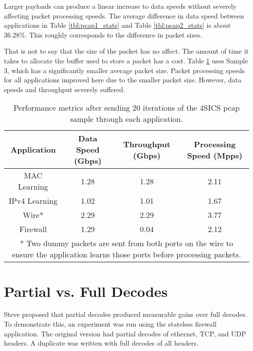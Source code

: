 Larger payloads can produce a linear increase to data speeds without severely affecting packet processing speeds. The average difference in data speed between applications in Table \ref{tbl:pcap1_stats} and Table \ref{tbl:pcap2_stats} is about 36.28\%. This roughly corresponds to the difference in packet sizes.

That is not to say that the size of the packet has no affect. The amount of time it takes to allocate the buffer used to store a packet has a cost. Table \ref{tbl:pcap3_stats} uses Sample 3, which has a significantly smaller average packet size. Packet processing speeds for all applications improved here due to the smaller packet size. However, data speeds and throughput severely suffered.

\begin{table}[ht]
\caption{Performance metrics after sending 20 iterations of the 4SICS pcap sample through each application.}
\begin{center}
\begin{tabularx}{\linewidth}{| c || c | c | c | }
\hline
Application & Data Speed (Gbps) & Throughput (Gbps) & Processing Speed (Mpps) \\
\hline
MAC Learning & 1.28 & 1.28 & 2.11  \\
\hline
IPv4 Learning & 1.02 & 1.01 & 1.67  \\
\hline 
Wire* & 2.29 & 2.29 & 3.77 \\
\hline
Firewall & 1.29 & 0.04 & 2.12 \\
\hline
\multicolumn{4}{p{\linewidth}}{* Two dummy packets are sent from both ports on the wire to ensure the application learns those ports before processing packets.}
\end{tabularx}
\end{center}
\label{tbl:pcap3_stats}
\end{table}


\section{Partial vs. Full Decodes} \label{exp:decode_comparison}

Steve proposed that partial decodes produced measurable gains over full decodes. To demonstrate this, an experiment was run using the stateless firewall application. The original version had partial decodes of ethernet, TCP, and UDP headers. A duplicate was written with full decodes of all headers.

